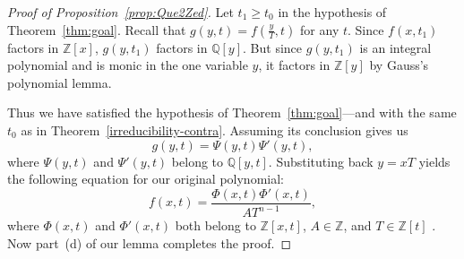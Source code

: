\documentclass{article}
\theoremstyle{plain}
\theoremstyle{definition}
\renewcommand{\geq}{\geqslant}  %
\newcommand{\Que}{\mathbb{Q}}   %
\newcommand{\Zed}{\mathbb{Z}}   %
\begin{document}
\begin{proof}
[Proof of Proposition~\ref{prop:Que2Zed}]   %
Let $t_1 \geq t_0$ in the hypothesis of Theorem~\ref{thm:goal}.
Recall that $g(y,t) = f(\frac{y}{T},t)$ for any $t$.  
Since $f(x,t_1)$ factors in $\Zed[x]$, $g(y,t_1)$ factors in $\Que[y]$.  But since $g(y,t_1)$ is an integral polynomial
and is monic in the one variable $y$, it factors in $\Zed[y]$ by Gauss's polynomial lemma.

Thus we have satisfied the hypothesis of Theorem~\ref{thm:goal}---and with the same $t_0$ as in
Theorem~\ref{irreducibility-contra}.  Assuming its conclusion gives us
\[
g(y,t) = \Psi(y,t) \Psi'(y,t),
\]
%
where $\Psi(y,t)$ and $\Psi'(y,t)$ belong to $\Que[y,t]$.  Substituting back $y = xT$ yields the following equation for our
original polynomial:
\[
f(x,t) = \frac{\Phi(x,t) \Phi'(x,t)}{AT^{n-1}},
\]
where $\Phi(x,t)$ and $\Phi'(x,t)$ both belong to $\Zed[x,t]$, 
$A \in \Zed$, and $T \in \Zed[t]$ . Now part~(d) of our lemma completes
the proof.
\end{proof}


\end{document}
